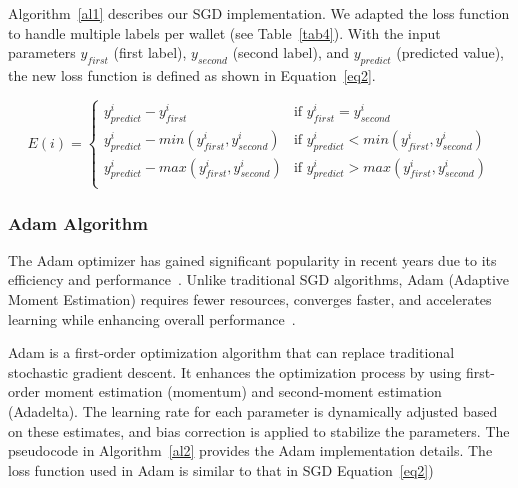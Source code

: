 \documentclass[runningheads]{llncs}
\begin{document}
{Algorithm~\ref{al1} describes our SGD implementation.
We adapted the loss function to handle multiple labels per wallet (see Table~\ref{tab4}). With the input parameters $y_{first}$ (first label), $y_{second}$ (second label), and $y_{predict}$ (predicted value), the new loss function is defined as shown in Equation~\ref{eq2}.


\begin{equation}\label{eq2}
E(i) = \left\{
\begin{array}{ll}
y_{predict}^i - y_{first}^i & \text{if } y_{first}^i = y_{second}^i \\
y_{predict}^i - min(y_{first}^i, y_{second}^i) & \text{if } y_{predict}^i < min(y_{first}^i, y_{second}^i) \\
y_{predict}^i - max(y_{first}^i, y_{second}^i) & \text{if } y_{predict}^i > max(y_{first}^i, y_{second}^i)\\
\end{array}
\right.
\end{equation}

\subsubsection{Adam Algorithm}
The Adam optimizer has gained significant popularity in recent years due to its efficiency and performance~\cite{kingma2014adam}. Unlike traditional SGD algorithms, Adam (Adaptive Moment Estimation) requires fewer resources, converges faster,  and accelerates learning while enhancing overall performance~\cite{yaguchi2018adam}. %

Adam is a first-order optimization algorithm that can replace traditional stochastic gradient descent. It enhances the optimization process by using first-order moment estimation (momentum) and second-moment estimation (Adadelta). The learning rate for each parameter is dynamically adjusted based on these estimates, and bias correction is applied to stabilize the parameters. The pseudocode in Algorithm~\ref{al2} provides the Adam implementation details. The loss function used in Adam is similar to that in SGD Equation~\ref{eq2})


}
\end{document}
